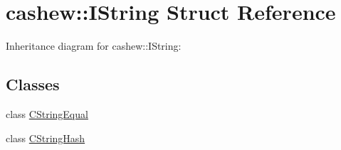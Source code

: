 \hypertarget{structcashew_1_1_i_string}{}\section{cashew\+:\+:I\+String Struct Reference}
\label{structcashew_1_1_i_string}


Inheritance diagram for cashew\+:\+:I\+String\+:
\subsection*{Classes}
\begin{DoxyCompactItemize}
\item 
class \mbox{\hyperlink{classcashew_1_1_i_string_1_1_c_string_equal}{C\+String\+Equal}}
\item 
class \mbox{\hyperlink{classcashew_1_1_i_string_1_1_c_string_hash}{C\+String\+Hash}}
\end{DoxyCompactItemize}
